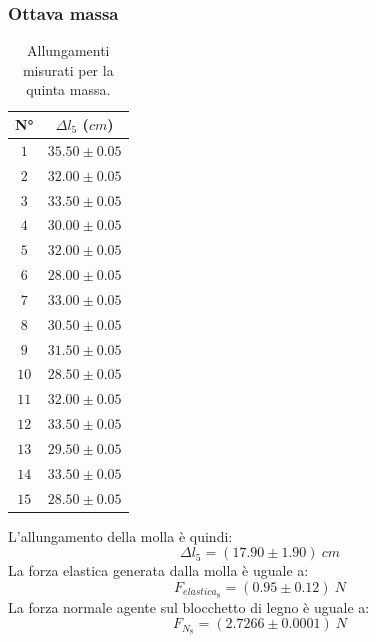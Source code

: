 \documentclass[11pt]{article}
\begin{document}
\subsubsection{Ottava massa}
\begin{table}[H]
\centering
\begin{tabular}{|c|c|}
\hline
\textbf{N°} & \textbf{$\Delta l_5$ ($cm$)}\\
\hline
$1$ & $35.50\pm 0.05$ \\
\hline
$2$ & $32.00\pm 0.05$ \\
\hline
$3$ & $33.50\pm 0.05$ \\
\hline
$4$ & $30.00\pm 0.05$ \\
\hline
$5$ & $32.00\pm 0.05$ \\
\hline
$6$ & $28.00\pm 0.05$ \\
\hline
$7$ & $33.00\pm 0.05$ \\
\hline
$8$ & $30.50\pm 0.05$ \\
\hline
$9$ & $31.50\pm 0.05$ \\
\hline
$10$ & $28.50\pm 0.05$ \\
\hline
$11$ & $32.00\pm 0.05$ \\
\hline
$12$ & $33.50\pm 0.05$ \\
\hline
$13$ & $29.50\pm 0.05$ \\
\hline
$14$ & $33.50\pm 0.05$ \\
\hline
$15$ & $28.50\pm 0.05$ \\
\hline
\end{tabular}
\caption{Allungamenti misurati per la quinta massa.}
\label{tab:}
\end{table}
L'allungamento della molla è quindi:
\begin{equation}
    \Delta l_5=(17.90\pm 1.90)\ cm
\end{equation}
La forza elastica generata dalla molla è uguale a:
\begin{equation}
    F_{elastica_8} = (0.95\pm 0.12)\ N
\end{equation}
La forza normale agente sul blocchetto di legno è uguale a:
\begin{equation}
    F_{N_8} = (2.7266\pm 0.0001)\ N
\end{equation}
\end{document}
